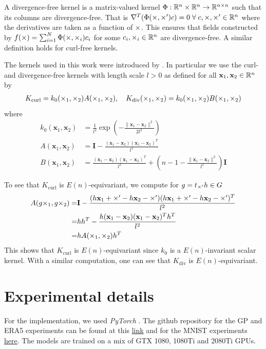 \label{sec:divcurl}
A divergence-free kernel is a matrix-valued kernel $\Phi: \mathbb{R}^n\times \mathbb{R}^n \to \mathbb{R}^{n \times n}$ such that its columns are divergence-free.
That is $\nabla^T(\Phi(\times,\times')c) = 0 \; \forall \; c,\times,\times' \in \mathbb{R}^n$ where the derivatives are taken as a function of $\times$.
This ensures that fields constructed by $f(\times) = \sum_{i=1}^N \Phi(\times, \times_i)c_i$ for some $c_i, \times_i \in \mathbb{R}^n$ are divergence-free.
A similar definition holds for curl-free kernels.

The kernels used in this work were introduced by \textcite{macedo2010learning}.
In particular we use the curl- and divergence-free kernels with length scale $l>0$ as defined for all $\mathbf{x}_1,\mathbf{x}_2\in\mathbb{R}^n$ by \begin{align} K_{\text{curl}}=k_0(\times_1,\times_2)A(\times_1,\times_2),\quad K_{\text{div}}(\times_1,\times_2)=k_0(\times_1,\times_2)B(\times_1,\times_2) \end{align} where \begin{align} k_0(\mathbf{x}_1,\mathbf{x}_2)&=\frac{1}{l^{2}}\exp\left(-\frac{\|\mathbf{x}_1-\mathbf{x}_2\|^{2}}{2l^{2}}\right )\\ A(\mathbf{x}_1,\mathbf{x}_2)&=\mathbf{I}-\frac{(\mathbf{x}_1-\mathbf{x}_2)(\mathbf{x}_1-\mathbf{x}_2)^T}{l^2} \\ B(\mathbf{x}_1,\mathbf{x}_2)&=\frac{(\mathbf{x}_1-\mathbf{x}_2)(\mathbf{x}_1-\mathbf{x}_2)^T}{l^2}+\left( n-1-\frac{\|\mathbf{x}_1-\mathbf{x}_2\|^{2}}{l^{2}} \right)\mathbf{I} \end{align} 

To see that $K_{\text{curl}}$ is $E(n)$-equivariant, we compute for $g=t_{\times'}h\in G$ \begin{align} A(g\times_1,g\times_2)=&\mathbf{I}-\frac{(h\mathbf{x}_1+\times'-h\mathbf{x}_2-\times')(h\mathbf{x}_1+\times'-h\mathbf{x}_2-\times')^T}{l^2}\\ =&hh^{T}-\frac{h(\mathbf{x}_1-\mathbf{x}_2)(\mathbf{x}_1-\mathbf{x}_2)^Th^T}{l^2}\\ =&hA(\times_1,\times_2)h^T \end{align} This shows that $K_{\text{curl}}$ is $E(n)$-equivariant since $k_0$ is a $E(n)$-invariant scalar kernel.
With a similar computation, one can see that $K_{\text{div}}$ is $E(n)$-equivariant.

\section{Experimental details}
\label{sec:Experimental details}

For the implementation, we used \emph{PyTorch} \parencite{PyTorch}.
The github repository for the GP and ERA5 experiments can be found at this \href{https://github.com/PeterHolderrieth/Steerable_CNPs}{link} and for the MNIST experiments \href{https://github.com/MJHutchinson/SteerableCNP}{here}.
The models are trained on a mix of GTX 1080, 1080Ti and 2080Ti GPUs.

